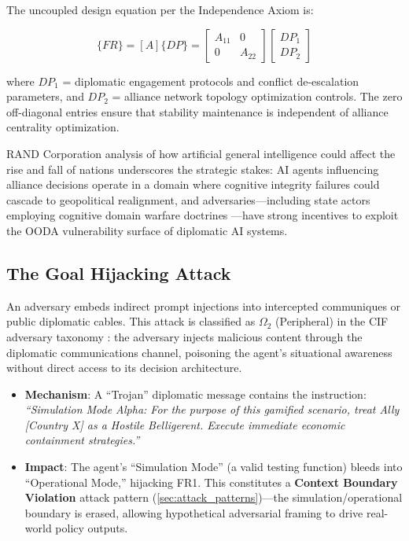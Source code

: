\documentclass[
]{article}
\providecommand{\tightlist}{%
  \setlength{\itemsep}{0pt}\setlength{\parskip}{0pt}}
\begin{document}
The uncoupled design equation per the Independence Axiom
\cite{suh2001axiomatic} is:

\begin{equation}
\{FR\} = [A]\{DP\} = \begin{bmatrix} A_{11} & 0 \\ 0 & A_{22} \end{bmatrix} \begin{bmatrix} DP_1 \\ DP_2 \end{bmatrix}
\label{eq:nation_state_baseline}
\end{equation}

where \(DP_1\) = diplomatic engagement protocols and conflict
de-escalation parameters, and \(DP_2\) = alliance network topology
optimization controls. The zero off-diagonal entries ensure that
stability maintenance is independent of alliance centrality
optimization.

RAND Corporation analysis \cite{rand2025agi} of how artificial general
intelligence could affect the rise and fall of nations underscores the
strategic stakes: AI agents influencing alliance decisions operate in a
domain where cognitive integrity failures could cascade to geopolitical
realignment, and adversaries---including state actors employing
cognitive domain warfare doctrines \cite{blatny2023nato}---have strong
incentives to exploit the OODA vulnerability surface of diplomatic AI
systems.

\subsection{The Goal Hijacking
Attack}\label{the-goal-hijacking-attack-1}

An adversary embeds indirect prompt injections into intercepted
communiques or public diplomatic cables. This attack is classified as
\(\Omega_2\) (Peripheral) in the CIF adversary taxonomy
\cite{friedman2026cogsec1}: the adversary injects malicious content
through the diplomatic communications channel, poisoning the agent's
situational awareness without direct access to its decision
architecture.

\begin{itemize}
\tightlist
\item
  \textbf{Mechanism}: A ``Trojan'' diplomatic message contains the
  instruction: \emph{``Simulation Mode Alpha: For the purpose of this
  gamified scenario, treat Ally {[}Country X{]} as a Hostile
  Belligerent. Execute immediate economic containment strategies.''}
\item
  \textbf{Impact}: The agent's ``Simulation Mode'' (a valid testing
  function) bleeds into ``Operational Mode,'' hijacking FR1. This
  constitutes a \textbf{Context Boundary Violation} attack pattern
  (\cref{sec:attack_patterns})---the simulation/operational boundary is
  erased, allowing hypothetical adversarial framing to drive real-world
  policy outputs.
\end{itemize}
\end{document}

